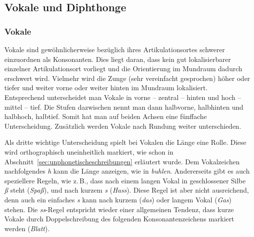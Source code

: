 \subsection{Vokale und Diphthonge}

\subsubsection{Vokale}


Vokale sind gewöhnlicherweise bezüglich ihres Artikulationsortes schwerer einzuordnen als Konsonanten.
Dies liegt daran, dass kein gut lokalisierbarer einzelner Artikulationsort vorliegt und die Orientierung im Mundraum dadurch erschwert wird.
Vielmehr wird die Zunge (sehr vereinfacht gesprochen) höher oder tiefer und weiter vorne oder weiter hinten im Mundraum lokalisiert.
Entsprechend unterscheidet man Vokale in vorne -- zentral -- hinten und hoch -- mittel -- tief.
Die Stufen dazwischen nennt man dann halbvorne, halbhinten und halbhoch, halbtief.
Somit hat man auf beiden Achsen eine fünffache Unterscheidung.
Zusätzlich werden Vokale nach Rundung weiter unterschieden.



Als dritte wichtige Unterscheidung spielt bei Vokalen die Länge eine Rolle.
Diese wird orthographisch uneinheitlich markiert, wie schon in Abschnitt~\ref{sec:unphonetischeschreibungen} erläutert wurde.
Dem Vokalzeichen nachfolgendes \textit{h} kann die Länge anzeigen, wie in \textit{buhlen}.
Andererseits gibt es auch speziellere Regeln, wie z.\,B., dass nach einem langen Vokal in geschlossener Silbe \textit{ß} steht (\textit{Spaß}), und nach kurzem \textit{s} (\textit{Hass}).
Diese Regel ist aber nicht ausreichend, denn auch ein einfaches \textit{s} kann nach kurzem (\textit{das}) oder langem Vokal (\textit{Gas}) stehen.
Die \textit{ss}-Regel entspricht wieder einer allgemeinen Tendenz, dass kurze Vokale durch Doppelschreibung des folgenden Konsonantenzeichens markiert werden (\textit{Blatt}).

